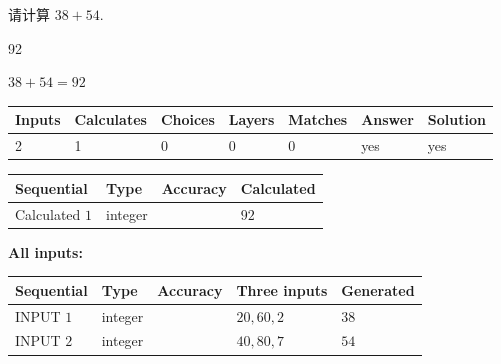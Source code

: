\documentclass{ctexart}
\begin{document}
  
 
请计算 $ %
38 +  %
54 $.
 
 
 
\noindent{}
 
 

92
 
 
\noindent{}
 
 

 
 
 
\noindent{}
 
 

$ %
38 +  %
54=   %
92$
 
 
\noindent{}
 
 

 
   
   
   
   
\noindent\begin{tabular}{|l|l|l|l|l|l|l|}
 \hline
Inputs & Calculates & Choices & Layers & Matches & Answer & Solution \\ \hline
 2  & 
 1  & 
 0
  & 
 0  & 
 0  & 
  yes & 
  yes 
  \\ \hline
 \end{tabular}
   
   
   
   
\noindent{}
   
   
  
  
\noindent\begin{tabular}{|l|l|l|l|}
\hline
 Sequential & Type & Accuracy & Calculated \\ 
\hline
 
 
  Calculated $  1 $ & integer &  & 
  $ 92 $ 
 \\  \hline  
 \end{tabular}
   
   
   
   
\noindent\vspace{0.1in}\hspace{-0.08in} {\textbf{\Large{All inputs: }}}
   
   
  
  
\noindent\begin{tabular}{|l|l|l|l|l|}
\hline
 Sequential & Type & Accuracy & Three inputs & Generated \\ 
\hline
 
 
  INPUT $  1 $ & integer &  & $
 20
 , 
 60
 , 
 2
 $ & $ 38 $ 
 \\  \hline  
 
 
  INPUT $  2 $ & integer &  & $
 40
 , 
 80
 , 
 7
 $ & $ 54 $ 
 \\  \hline  
 \end{tabular}
   
\end{document}
